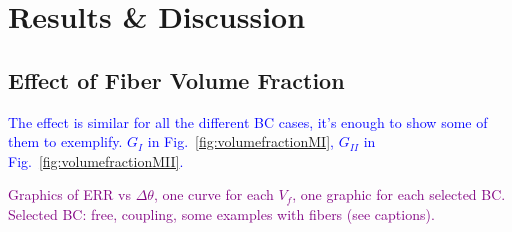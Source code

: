 \documentclass[review]{elsarticle}
\begin{document}
\section{Results \& Discussion}

\subsection{Effect of Fiber Volume Fraction}

\textcolor{blue}{The effect is similar for all the different BC cases, it's enough to show some of them to exemplify. $G_{I}$ in Fig.~\ref{fig:volumefractionMI}, $G_{II}$ in Fig.~\ref{fig:volumefractionMII}.}

\textcolor{purple}{Graphics of ERR vs $\Delta\theta$, one curve for each $V_{f}$, one graphic for each selected BC. Selected BC: free, coupling, some examples with fibers (see captions).}
\end{document}
